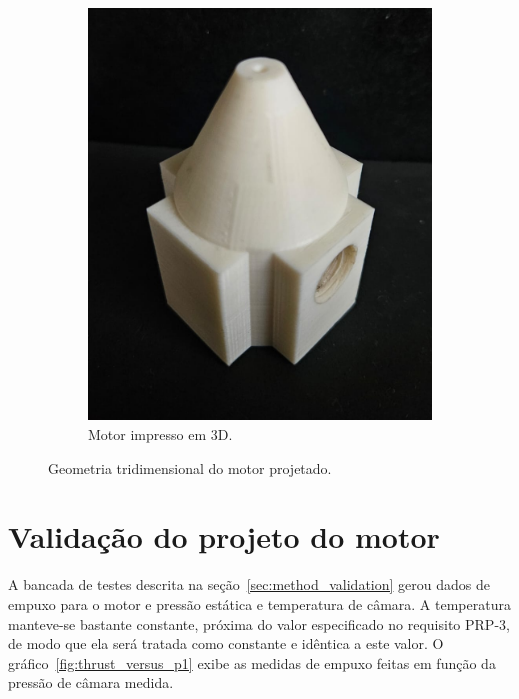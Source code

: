 \begin{figure}[htbp]
\begin{subfigure}{0.49\textwidth}
        \includegraphics[width=\textwidth]{img/motor_real.png}
        \caption{Motor impresso em 3D.}
    \end{subfigure}
    \caption{Geometria tridimensional do motor projetado.}\label{fig:3d_geom}
\end{figure}

\section{Validação do projeto do motor}\label{sec:result_validation}

A bancada de testes descrita na seção~\ref{sec:method_validation} gerou dados de empuxo para o motor e pressão estática e temperatura de câmara. A temperatura manteve-se bastante constante, próxima do valor especificado no requisito PRP-3, de modo que ela será tratada como constante e idêntica a este valor. O gráfico~\ref{fig:thrust_versus_p1} exibe as medidas de empuxo feitas em função da pressão de câmara medida.

